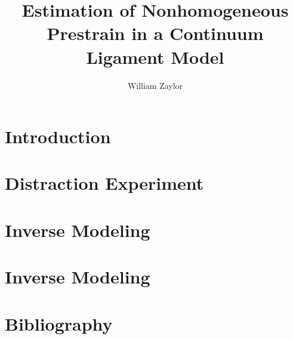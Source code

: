 \documentclass{report}
\author{William Zaylor}
\title{Estimation of Nonhomogeneous Prestrain in a Continuum Ligament Model}
\begin{document}
\maketitle

\chapter{Introduction}


\chapter{Distraction Experiment}


\chapter{Inverse Modeling}


\chapter{Inverse Modeling}


\chapter{Bibliography}

\end{document}
